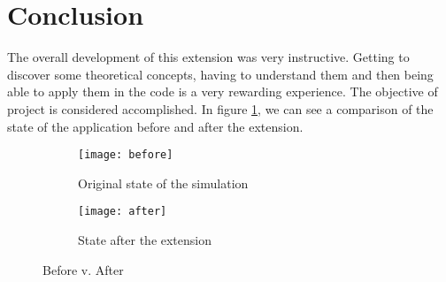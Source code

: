 \section{Conclusion}

The overall development of this extension was very instructive. Getting to
discover some theoretical concepts, having to understand them and then being
able to apply them in the code is a very rewarding experience. The objective of
project is considered accomplished. In figure \ref{fig:before_after}, we can see
a comparison of the state of the application before and after the extension.

\begin{figure}[H]
	\centering
	\hfill
	\begin{subfigure}[]{.4\textwidth}
		\centering
		\texttt{[image: before]}
		\caption{Original state of the simulation}
	\end{subfigure}
	\hfill
	\begin{subfigure}[]{.4\textwidth}
		\centering
		\texttt{[image: after]}
		\caption{State after the extension}
	\end{subfigure}
	\hfill\null
	\caption{Before v. After}
	\label{fig:before_after}
\end{figure}
